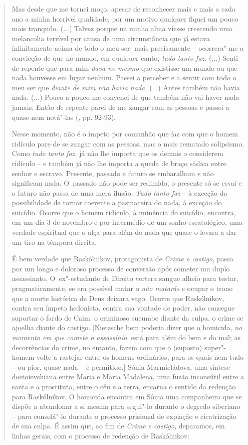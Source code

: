 {\begin{quote}
Mas desde que me tornei moço, apesar de reconhecer mais e mais a cada
ano a minha horrível qualidade, por um motivo qualquer fiquei um pouco
mais tranquilo. (...) Talvez porque na minha alma viesse crescendo uma
melancolia terrível por causa de uma circunstância que já estava
infinitamente acima de todo o meu ser: mais precisamente -- ocorrera"-me
a convicção de que no mundo, em qualquer canto, \emph{tudo tanto faz.}
(...) Senti de repente que para mim \emph{dava no mesmo} que existisse
um mundo ou que nada houvesse em lugar nenhum. Passei a perceber e a
sentir com todo o meu ser que \emph{diante de mim não havia nada.} (...)
Antes também não havia nada. (...) Pouco a pouco me convenci de que
também não vai haver nada jamais. Então de repente parei de me zangar
com as pessoas e passei a quase nem notá"-las (, pp. 92-93).

Nesse momento, não é o ímpeto por comunhão que faz com que o homem
ridículo pare de se zangar com as pessoas, mas o mais rematado
solipsismo. Como \emph{tudo tanto faz}, já não lhe importa que os demais
o considerem ridículo -- e também já não lhe importa a queda de braço
sádica entre senhor e escravo. Presente, passado e futuro se embaralham
e não significam nada. O~passado não pode ser redimido, o presente só se
esvai e o futuro não passa de uma mera ilusão. \emph{Tudo tanto faz} --
à exceção da possibilidade de tornar coerente a pasmaceira do nada, à
exceção do suicídio. Ocorre que o homem ridículo, à iminência do
suicídio, encontra, em um dia 3 de novembro e por intermédio de um sonho
escatológico, uma verdade espiritual que o alça para além do nada que
quase o levara a dar um tiro na têmpora direita.

É bem verdade que Raskólnikov, protagonista de \emph{Crime e castigo},
passa por um longo e doloroso processo de conversão após cometer um
duplo assassinato. O~ex"-estudante de Direito vertera sangue alheio para
testar, pragmaticamente, se era possível matar o \emph{não matarás} e
ocupar o trono que a morte histórica de Deus deixara vago. Ocorre que
Raskólnikov, contra seu ímpeto hedonista, contra sua vontade de poder,
não consegue suportar o fardo de Caim: o criminoso sucumbe diante da
culpa, o crime se ajoelha diante do castigo. {[}Nietzsche bem poderia
dizer que o homicida, \emph{no momento em que comete o assassínio}, está
para além do bem e do mal; as decorrências do crime, no entanto, fazem
com que o (suposto) super"-homem volte a rastejar entre os homens
ordinários, para os quais nem tudo -- ou pior, quase nada -- é
permitido.{]} Sônia Marmieládova, uma síntese dostoievskiana entre Maria
e Maria Madalena, uma fusão inconsútil entre a santa e a prostituta,
entre o céu e a terra, encarna o sentido da redenção para Raskólnikov. O
homicida encontra em Sônia uma companheira que se dispõe a abandonar a
si mesma para segui"-lo durante o degredo siberiano -- para consolá"-lo
durante o processo prisional de expiação e cicatrização de sua culpa. É
assim que, ao fim de \emph{Crime e castigo}, deparamos, em linhas
gerais, com o processo de redenção de Raskólnikov:


\end{quote}}

